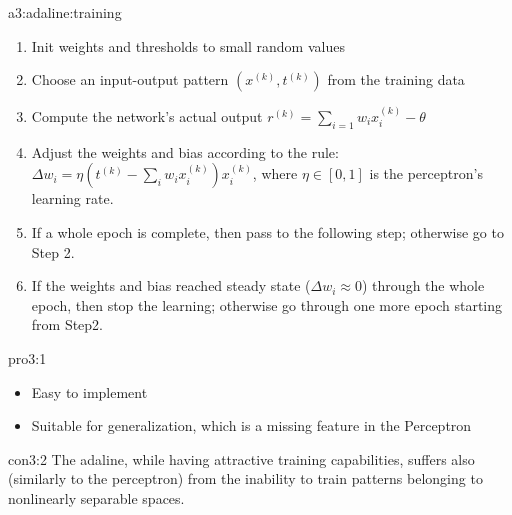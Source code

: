 \documentclass{tron}
\begin{document}
\begin{algo}{a3:adaline:training}
	\begin{enumerate}
		\item Init weights and thresholds to small random values
		\item Choose an input-output pattern $(x^{(k)}, t^{(k)})$ from the training data
		\item Compute the network's actual output $r^{(k)} = \sum_{i=1} w_i x_i^{(k)} - \theta $
		\item Adjust the weights and bias according to the  rule:\\
				$\Delta w_i = \eta \left( t^{(k)} - \sum_{i} w_i x_i^{(k)} \right) x_i^{(k)}$, where $\eta \in [0,1]$ is the perceptron's learning rate.
		\item If a whole epoch is complete, then pass to the following step; otherwise go to Step 2.
		\item If the weights and bias reached steady state ($\Delta w_i \approx 0$) through the whole epoch, then stop the learning; otherwise go through one more epoch starting from Step2.
	\end{enumerate}
\end{algo}

\begin{pros}{pro3:1}
	\begin{itemize}
		\item Easy to implement
		\item Suitable for generalization, which is a missing feature in the Perceptron
	\end{itemize}
\end{pros}
\begin{cons}[Adaline]{con3:2}
The adaline, while having attractive training capabilities, suﬀers also (similarly to the perceptron) from the inability to train patterns belonging to nonlinearly separable spaces.
\end{cons}
\end{document}
